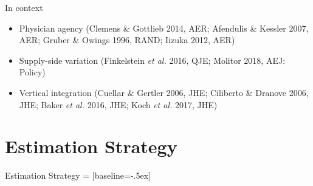 \documentclass[t,aspectratio=169]{beamer}
\begin{document}
\begin{frame}{In context}
    \begin{itemize}
        \item Physician agency (Clemens \& Gottlieb 2014, AER; Afendulis \& Kessler 2007, AER; Gruber \& Owings 1996, RAND; Iizuka 2012, AER)
        \item Supply-side variation (Finkelstein \textit{et al.} 2016, QJE; Molitor 2018, AEJ: Policy)
        \item Vertical integration (Cuellar \& Gertler 2006, JHE; Ciliberto \& Dranove 2006, JHE; Baker \textit{et al.} 2016, JHE; Koch \textit{et al.} 2017, JHE)
    \end{itemize}
\end{frame}

\section{Estimation Strategy}
\begin{frame}{Estimation Strategy}
     = [baseline=-.5ex]
\end{frame}
\end{document}
